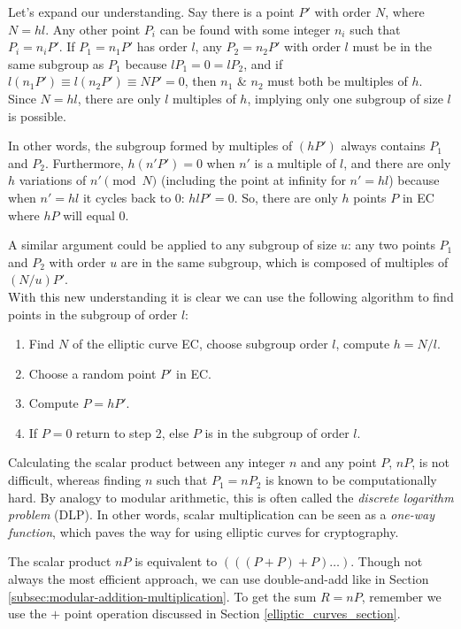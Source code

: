 Let's expand our understanding. Say there is a point $P'$ with order $N$, where $N=h l$. Any other point $P_i$ can be found with some integer $n_i$ such that $P_i=n_i P'$. If $P_1=n_1 P'$ has order $l$, any $P_2=n_2 P'$ with order $l$ must be in the same subgroup as $P_1$ because $l P_1=0 = l P_2$, and if $l(n_1 P') \equiv l(n_2 P') \equiv N P'=0$, then $n_1$ \& $n_2$ must both be multiples of $h$. Since $N= h l$, there are only $l$ multiples of $h$, implying only one subgroup of size $l$ is possible.

In other words, the subgroup formed by multiples of $(h P')$ always contains $P_1$ and $P_2$. Furthermore, $h(n' P')=0$ when $n'$ is a multiple of $l$, and there are only $h$ variations of $n' \pmod N$ (including the point at infinity for $n' = hl$) because when $n' = h l$ it cycles back to 0: $h l P' = 0$. So, there are only $h$ points $P$ in EC where $h P$ will equal 0.

A similar argument could be applied to any subgroup of size $u$: any two points $P_1$ and $P_2$ with order $u$ are in the same subgroup, which is composed of multiples of $(N/u) P'$.
\\ \newline
With this new understanding it is clear we can use the following algorithm to find points in the subgroup of order $l$:
\begin{enumerate}
    \item Find $N$ of the elliptic curve EC, choose subgroup order $l$, compute $h=N/l$.
    \item Choose a random point $P'$ in EC.
    \item Compute $P=h P'$.
    \item If $P=0$ return to step 2, else $P$ is in the subgroup of order $l$.
\end{enumerate}

Calculating the scalar product between any integer $n$ and any point $P$, $nP$, is not difficult, whereas finding $n$ such that $P_1 = n P_2$ is known to be computationally hard. By analogy to modular arithmetic, this is often called the {\em discrete logarithm problem} (DLP). In other words, scalar multiplication can be seen as a {\em one-way function}, which paves the way for using elliptic curves for cryptography.

The scalar product $nP$ is equivalent to $(((P+P)+P)…)$. Though not always the most efficient approach, we can use double-and-add like in Section \ref{subsec:modular-addition-multiplication}. To get the sum $R = n P$, remember we use the $+$ point operation discussed in Section \ref{elliptic_curves_section}.

